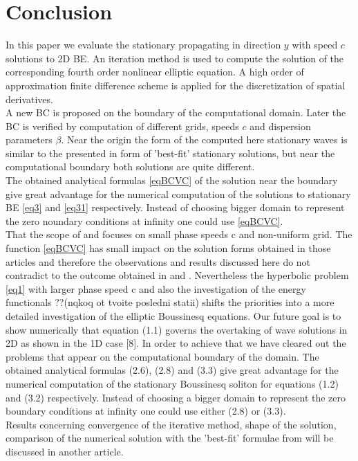 \documentclass[12pt]{article}
\theoremstyle{theorem}
\theoremstyle{defi}
\begin{document}
\section{Conclusion}
	In this paper we evaluate the stationary propagating in direction $y$ with speed $c$ solutions to 2D BE. An iteration method is used to compute the solution of the corresponding fourth order nonlinear  elliptic equation. A high order of approximation finite difference scheme is applied for the discretization of spatial derivatives.
\\
A new BC is proposed on the boundary of the computational domain. Later the BC is verified by computation of different grids, speeds $c$ and dispersion parameters $\beta$. Near the origin the form of the computed here stationary waves is similar to the presented in \cite{ref10} form of 'best-fit' stationary solutions, but near the computational boundary both solutions are quite different.
\\
The obtained analytical formulas \eqref{eqBCVC} of the solution near the boundary give great advantage for the numerical computation of the solutions to stationary BE \eqref{eq3} and \eqref{eq31} respectively. Instead of choosing bigger domain to represent the zero noundary conditions at infinity one could use \eqref{eqBCVC}.
\\
	That the scope of \cite{ref6} and \cite{ref10} focuses on small phase speeds c and non-uniform grid. The function \eqref{eqBCVC} has small impact on the solution forms obtained in those articles and therefore the observations and results discussed here do not contradict to the outcome obtained in \cite{ref6} and \cite{ref10}. Nevertheless the hyperbolic problem \eqref{eq1} with larger phase speed c and also the investigation of the energy functionals ??(nqkoq ot tvoite posledni statii) shifts the priorities into a more detailed investigation of the elliptic Boussinesq equations. Our future goal is to show numerically that equation (1.1) governs the overtaking of wave solutions in 2D as shown in the 1D case [8]. In order to achieve that we have cleared out the problems that appear on the computational boundary of the domain.  The obtained analytical formulas (2.6), (2.8) and (3.3) give great advantage for the numerical computation of the stationary Boussinesq soliton for equations (1.2) and  (3.2) respectively. Instead of choosing a bigger domain to represent the zero boundary conditions at infinity one could use either (2.8) or (3.3).
\\
Results concerning convergence of the iterative method, shape of the solution, comparison of the numerical solution with the 'best-fit' formulae from \cite{ref10}  will be discussed in another article.
\end{document}
